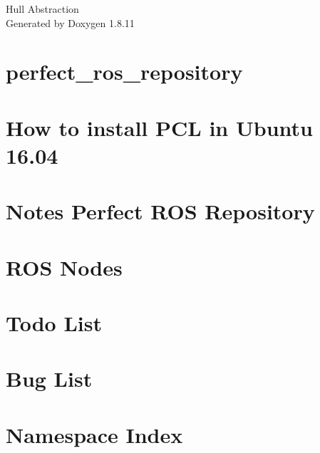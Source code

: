 \documentclass[twoside]{book}
\newcommand{\+}{\discretionary{\mbox{\scriptsize$\hookleftarrow$}}{}{}}
\newcommand{\clearemptydoublepage}{%
  \newpage{\pagestyle{empty}\cleardoublepage}%
}
\begin{document}
\hypersetup{pageanchor=false,
             bookmarksnumbered=true,
             pdfencoding=unicode
            }
\begin{titlepage}
\vspace*{7cm}
\begin{center}%
{\Large Hull Abstraction }\\
\vspace*{1cm}
{\large Generated by Doxygen 1.8.11}\\
\end{center}
\end{titlepage}
\clearemptydoublepage
\tableofcontents
\clearemptydoublepage
{}
\hypersetup{pageanchor=true}

\chapter{perfect\+\_\+ros\+\_\+repository}
\label{index}\hypertarget{index}{}
\chapter{How to install P\+CL in Ubuntu 16.04}
\label{md__home_jc_hull_abstraction_Installation_of_PCL}
\hypertarget{md__home_jc_hull_abstraction_Installation_of_PCL}{}

\chapter{Notes Perfect R\+OS Repository}
\label{md__home_jc_hull_abstraction_NOTES}
\hypertarget{md__home_jc_hull_abstraction_NOTES}{}

\chapter{R\+OS Nodes}
\label{ros_node}
\hypertarget{ros_node}{}

\chapter{Todo List}
\label{todo}
\hypertarget{todo}{}

\chapter{Bug List}
\label{bug}
\hypertarget{bug}{}

\chapter{Namespace Index}

\end{document}
